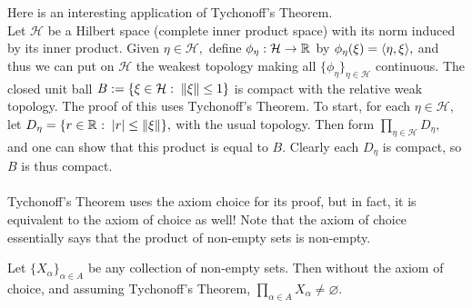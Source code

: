 \noindent\Ex Here is an interesting application of Tychonoff's Theorem. \\ Let $\mathcal{H}$ be a Hilbert space (complete inner product space) with its norm induced by its inner product. Given $\eta\in\mathcal{H},$ define $\phi_{\eta}:\mathcal{H}\rightarrow\mathbb{R}^{}$ by $\phi_{\eta}(\xi)=\langle \eta,\xi\rangle,$ and thus we can put on $\mathcal{H}$ the weakest topology making all $\{\phi_{\eta}\}_{\eta\in\mathcal{H}}$ continuous. The closed unit ball $B:=\{\xi\in\mathcal{H}:\;\left\lVert\xi\right\rVert\leq 1\}$ is compact with the relative weak topology. The proof of this uses Tychonoff's Theorem. To start, for each $\eta\in\mathcal{H},$ let $D_{\eta}=\{r\in\mathbb{R}^{}:\;|r|\leq\left\lVert\xi\right\rVert\},$ with the usual topology. Then form $\prod_{\eta\in\mathcal{H}} D_{\eta},$ and one can show that this product is equal to $B.$ Clearly each $D_{\eta}$ is compact, so $B$ is thus compact. \\ \\
Tychonoff's Theorem uses the axiom choice for its proof, but in fact, it is equivalent to the axiom of choice as well! Note that the axiom of choice essentially says that the product of non-empty sets is non-empty.
\begin{thm}
Let $\{X_{\alpha}\}_{\alpha\in A}$ be any collection of non-empty sets. Then without the axiom of choice, and assuming Tychonoff's Theorem, $\prod_{\alpha\in A} X_{\alpha}\neq\varnothing.$ \\ \\
\end{thm}

